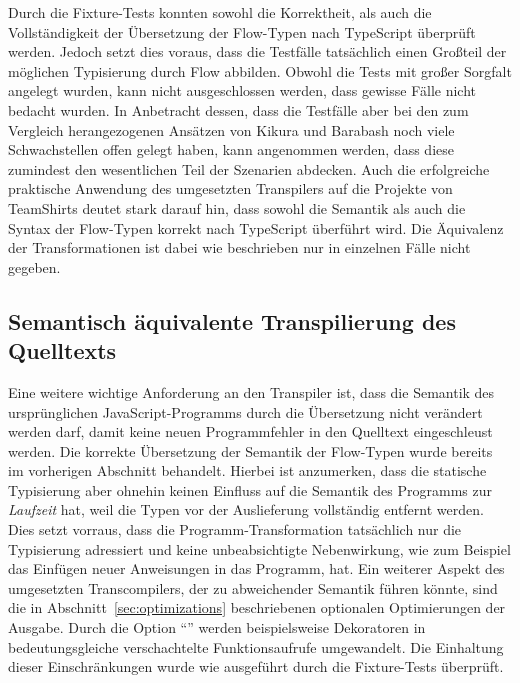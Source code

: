 Durch die Fixture-Tests konnten sowohl die Korrektheit, als auch die Vollständigkeit der Übersetzung der Flow-Typen nach TypeScript überprüft werden. Jedoch setzt dies voraus, dass die Testfälle tatsächlich einen Großteil der möglichen Typisierung durch Flow abbilden. Obwohl die Tests mit großer Sorgfalt angelegt wurden, kann nicht ausgeschlossen werden, dass gewisse Fälle nicht bedacht wurden. In Anbetracht dessen, dass die Testfälle aber bei den zum Vergleich herangezogenen Ansätzen von Kikura und Barabash noch viele Schwachstellen offen gelegt haben, kann angenommen werden, dass diese zumindest den wesentlichen Teil der Szenarien abdecken. Auch die erfolgreiche praktische Anwendung des umgesetzten Transpilers auf die Projekte von TeamShirts deutet stark darauf hin, dass sowohl die Semantik als auch die Syntax der Flow-Typen korrekt nach TypeScript überführt wird. Die Äquivalenz der Transformationen ist dabei wie beschrieben nur in einzelnen Fälle nicht gegeben.

\subsection{Semantisch äquivalente Transpilierung des Quelltexts}

Eine weitere wichtige Anforderung an den Transpiler ist, dass die Semantik des ursprünglichen JavaScript-Programms durch die Übersetzung nicht verändert werden darf, damit keine neuen Programmfehler in den Quelltext eingeschleust werden. Die korrekte Übersetzung der Semantik der Flow-Typen wurde bereits im vorherigen Abschnitt behandelt. Hierbei ist anzumerken, dass die statische Typisierung aber ohnehin keinen Einfluss auf die Semantik des Programms zur \emph{Laufzeit} hat, weil die Typen vor der Auslieferung vollständig entfernt werden. Dies setzt vorraus, dass die Programm-Transformation tatsächlich nur die Typisierung adressiert und keine unbeabsichtigte Nebenwirkung, wie zum Beispiel das Einfügen neuer Anweisungen in das Programm, hat. Ein weiterer Aspekt des umgesetzten Transcompilers, der zu abweichender Semantik führen könnte, sind die in Abschnitt~\ref{sec:optimizations} beschriebenen optionalen Optimierungen der Ausgabe. Durch die Option \enquote{} werden beispielsweise Dekoratoren in bedeutungsgleiche verschachtelte Funktionsaufrufe umgewandelt. Die Einhaltung dieser Einschränkungen wurde wie ausgeführt durch die Fixture-Tests überprüft.

